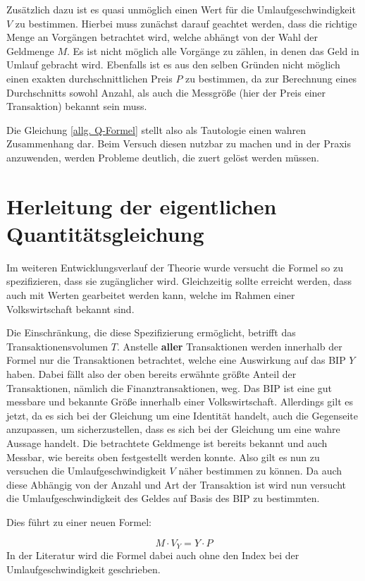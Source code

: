 Zusätzlich dazu ist es quasi unmöglich einen Wert für die Umlaufgeschwindigkeit $V$ zu bestimmen. Hierbei muss zunächst darauf geachtet werden, dass die richtige Menge an Vorgängen betrachtet wird, welche abhängt von der Wahl der Geldmenge $M$. Es ist nicht möglich alle Vorgänge zu zählen, in denen das Geld in Umlauf gebracht wird.
Ebenfalls ist es aus den selben Gründen nicht möglich einen exakten durchschnittlichen Preis $P$ zu bestimmen, da zur Berechnung eines Durchschnitts sowohl Anzahl, als auch die Messgröße (hier der Preis einer Transaktion) bekannt sein muss.

Die Gleichung \vref{allg. Q-Formel} stellt also als Tautologie einen wahren Zusammenhang dar. Beim Versuch diesen nutzbar zu machen und in der Praxis anzuwenden, werden Probleme deutlich, die zuert gelöst werden müssen.

\section{Herleitung der eigentlichen Quantitätsgleichung}
Im weiteren Entwicklungsverlauf der Theorie wurde versucht die Formel so zu spezifizieren, dass sie zugänglicher wird. Gleichzeitig sollte erreicht werden, dass auch mit Werten gearbeitet werden kann, welche im Rahmen einer Volkswirtschaft bekannt sind.

Die Einschränkung, die diese Spezifizierung ermöglicht, betrifft das Transaktionensvolumen $T$. Anstelle \textbf{aller} Transaktionen werden innerhalb der Formel nur die Transaktionen betrachtet, welche eine Auswirkung auf das BIP $Y$ haben. Dabei fällt also der oben bereits erwähnte größte Anteil der Transaktionen, nämlich die Finanztransaktionen, weg. Das BIP ist eine gut messbare und bekannte Größe innerhalb einer Volkswirtschaft. Allerdings gilt es jetzt, da es sich bei der Gleichung um eine Identität handelt, auch die Gegenseite anzupassen, um sicherzustellen, dass es sich bei der Gleichung um eine wahre Aussage handelt. Die betrachtete Geldmenge ist bereits bekannt und auch Messbar, wie bereits oben festgestellt werden konnte. Also gilt es nun zu versuchen die Umlaufgeschwindigkeit $V$ näher bestimmen zu können. Da auch diese Abhängig von der Anzahl und Art der Transaktion ist wird nun versucht die Umlaufgeschwindigkeit des Geldes auf Basis des BIP zu bestimmten.

Dies führt zu einer neuen Formel: 

$$ M \cdot V_Y = Y \cdot P$$\label{QFormel}
In der Literatur wird die Formel dabei auch ohne den Index bei der Umlaufgeschwindigkeit geschrieben.

